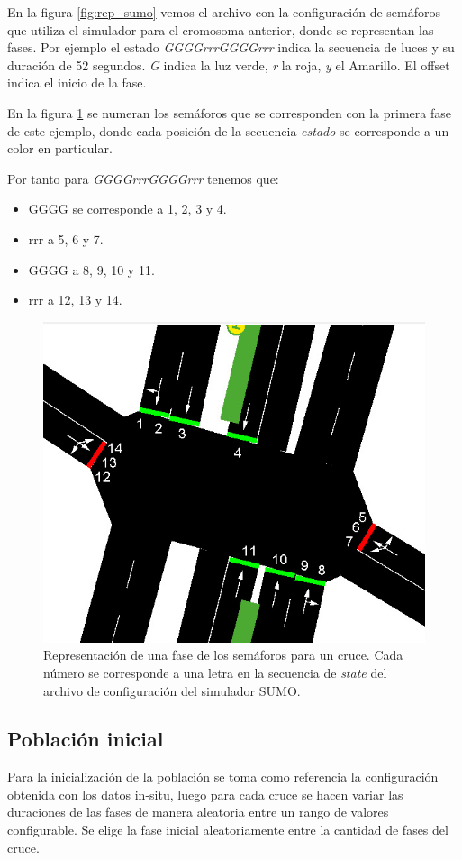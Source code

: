 En la figura \ref{fig:rep_sumo} vemos el archivo con la configuración de semáforos que utiliza el simulador para el cromosoma anterior, donde se representan las fases. Por ejemplo el estado \emph{GGGGrrrGGGGrrr} indica la secuencia de luces y su duración de 52 segundos. \emph{G} indica la luz verde, \emph{r} la roja, \emph{y} el Amarillo. El offset indica el inicio de la fase. 

En la figura \ref{fig:sem_numerados} se numeran los semáforos que se corresponden con la primera fase de este ejemplo, donde cada posición de la secuencia \emph{estado} se corresponde a un color en particular. 

\newpage
Por tanto para \emph{GGGGrrrGGGGrrr} tenemos que:
\begin{itemize}
\item GGGG se corresponde a 1, 2, 3 y 4. 
\item rrr a 5, 6 y 7. 
\item GGGG a 8, 9, 10 y 11. 
\item rrr a 12, 13 y 14. 
\end{itemize}
  
\begin{figure}[H]
	\centering
	\includegraphics[width=0.7\linewidth]{Figures/semaforos_numerado}
	\caption{Representación de una fase de los semáforos para un cruce. Cada número se corresponde a una letra en la secuencia de \emph{state} del archivo de configuración del simulador SUMO.}
	\label{fig:sem_numerados}
\end{figure}

\subsection{Población inicial}

Para la inicialización de la población se toma como referencia
la configuración obtenida con los datos in-situ, luego para cada
cruce se hacen variar las duraciones de las fases de manera aleatoria entre un rango de valores configurable. Se elige la fase inicial aleatoriamente entre la cantidad de fases del cruce.

